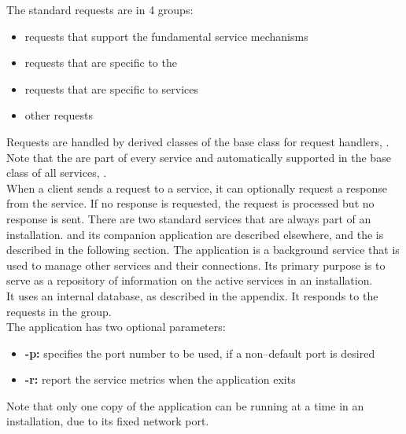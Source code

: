 The standard requests are in 4 groups:
\begin{itemize}
\item \textbf{} requests that support the
fundamental \mplusm{} service mechanisms
\item \textbf{} requests
that are specific to the 
\item \textbf{} requests that
are specific to  services
\item \textbf{} other
requests
\end{itemize}
Requests are handled by derived classes of the base class for request handlers,
.
Note that the  are part of every service and
automatically supported in the base class of all services,
.\\

When a client sends a request to a service, it can optionally request a response from the
service.
If no response is requested, the request is processed but no response is sent.
There are two standard services that are always part of an \mplusm{} installation.
 and its companion application
 are described elsewhere, and the
 is described in the following section.
The  application is a background service
that is used to manage other services and their connections.
Its primary purpose is to serve as a repository of information on the active services in
an \mplusm{} installation.\\

It uses an internal database, as described in the
 appendix.
It responds to the requests in the
 group.\\

The application has two optional parameters:
\begin{itemize}
\item \textbf{-p:} specifies the port number to be used, if a non--default port is desired
\item \textbf{-r:} report the service metrics when the application exits
\end{itemize}
Note that only one copy of the 
application can be running at a time in an \mplusm{} installation, due to its fixed
\yarp{} network port.\\

